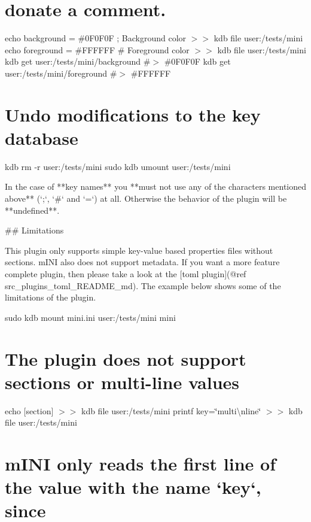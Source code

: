 \hypertarget{autotoc_md371_autotoc_md386}{}\section{donate a comment.}\label{autotoc_md371_autotoc_md386}
echo \textquotesingle{}background = \#0\+F0\+F0F ; Background color\textquotesingle{} $>$$>$ {\ttfamily kdb file user\+:/tests/mini} echo \textquotesingle{}foreground = \#F\+F\+F\+F\+FF \# Foreground color\textquotesingle{} $>$$>$ {\ttfamily kdb file user\+:/tests/mini} kdb get user\+:/tests/mini/background \#$>$ \#0\+F0\+F0F kdb get user\+:/tests/mini/foreground \#$>$ \#\+F\+F\+F\+F\+FF\hypertarget{autotoc_md371_autotoc_md387}{}\section{Undo modifications to the key database}\label{autotoc_md371_autotoc_md387}
kdb rm -\/r user\+:/tests/mini sudo kdb umount user\+:/tests/mini 
\begin{DoxyCode}
In the case of **key names** you **must not use any of the characters mentioned above** (`;`, `#` and `=`)
       at all. Otherwise the behavior of the plugin will be **undefined**.

## Limitations

This plugin only supports simple key-value based properties files without sections. mINI also does not
       support metadata. If you want a more feature complete plugin, then please take a look at the [toml plugin](@ref
       src\_plugins\_toml\_README\_md). The example below shows some of the limitations of the plugin.
\end{DoxyCode}
 sudo kdb mount mini.\+ini user\+:/tests/mini mini\hypertarget{autotoc_md371_autotoc_md388}{}\section{The plugin does not support sections or multi-\/line values}\label{autotoc_md371_autotoc_md388}
echo \textquotesingle{}\mbox{[}section\mbox{]}\textquotesingle{} $>$$>$ {\ttfamily kdb file user\+:/tests/mini} printf \textquotesingle{}key=\char`\"{}multi\textbackslash{}nline\char`\"{}\textquotesingle{} $>$$>$ {\ttfamily kdb file user\+:/tests/mini}\hypertarget{autotoc_md371_autotoc_md389}{}\section{m\+I\+N\+I only reads the first line of the value with the name `key`, since}\label{autotoc_md371_autotoc_md389}

